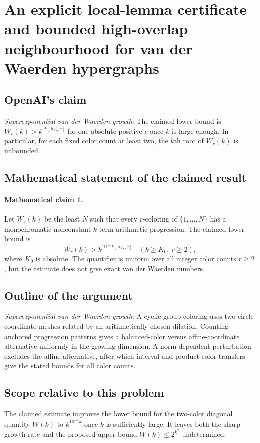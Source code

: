\documentclass[11pt]{article}
\begin{document}
\section*{An explicit local-lemma certificate and bounded high-overlap neighbourhood for van der Waerden hypergraphs}

\subsection{OpenAI's claim}
\textit{Superexponential van der Waerden growth}: The claimed lower bound is $W_r(k)>k^{ck\lfloor\log_2 r\rfloor}$ for one absolute positive $c$ once $k$ is large enough. In particular, for each fixed color count at least two, the $k$th root of $W_r(k)$ is unbounded.

\subsection{Mathematical statement of the claimed result}
\paragraph{Mathematical claim 1.} Let $W_r(k)$ be the least $N$ such that every $r$-coloring of $\{1,\ldots,N\}$ has a monochromatic nonconstant $k$-term arithmetic progression. The claimed lower bound is \[W_r(k)>k^{10^{-5}k\lfloor\log_2r\rfloor}\quad(k\ge K_0,\ r\ge2),\] where $K_0$ is absolute. The quantifier is uniform over all integer color counts $r\ge2$, but the estimate does not give exact van der Waerden numbers.

\subsection{Outline of the argument}
\textit{Superexponential van der Waerden growth}: A cyclic-group coloring uses two circle-coordinate meshes related by an arithmetically chosen dilation. Counting anchored progression patterns gives a balanced-color versus affine-coordinate alternative uniformly in the growing dimension. A norm-dependent perturbation excludes the affine alternative, after which interval and product-color transfers give the stated bounds for all color counts.

\subsection{Scope relative to this problem}
The claimed estimate improves the lower bound for the two-color diagonal quantity $W(k)$ to $k^{10^{-5}k}$ once $k$ is sufficiently large. It leaves both the sharp growth rate and the proposed upper bound $W(k)\le2^{k^2}$ undetermined.
\end{document}
